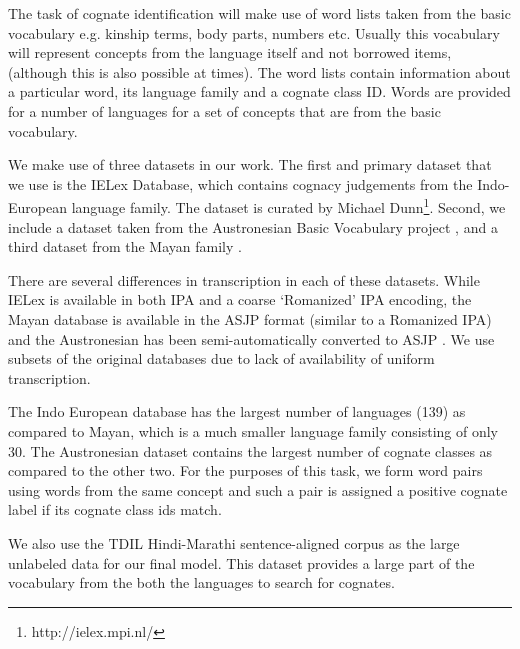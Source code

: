 \documentclass[11pt,letterpaper]{article}
\begin{document}
The task of cognate identification will make use of word lists taken from the basic vocabulary e.g. kinship terms, body parts, numbers etc. Usually this vocabulary will represent concepts from the language itself and not borrowed items, (although this is also possible at times). The word lists contain information about a particular word, its language family and a cognate class ID. Words are provided for a number of languages for a set of concepts that are from the basic vocabulary.

We make use of three datasets in our work. The first and primary dataset that we use is the IELex Database, which contains cognacy judgements from the Indo-European language family. The dataset is curated by Michael Dunn\footnote{http://ielex.mpi.nl/}. Second, we include a dataset taken from the Austronesian Basic Vocabulary project \cite{greenhillBlust:08}, and a third dataset from the Mayan family \cite{wichmann:2008}. 

There are several differences in transcription in each of these datasets. While IELex is available in both IPA and a coarse `Romanized' IPA encoding, the Mayan database is available in the ASJP format (similar to a Romanized IPA) \cite{Brown:08} and the Austronesian has been semi-automatically converted to ASJP \cite{rama2016siamese}. We use subsets of the original databases due to lack of availability of uniform transcription.

The Indo European database has the largest number of languages (139) as compared to Mayan, which is a much smaller language family consisting of only 30. The Austronesian dataset contains the largest number of cognate classes as compared to the other two. For the purposes of this task, we form word pairs using words from the same concept and such a pair is assigned a positive cognate label if its cognate class ids match. 

We also use the TDIL Hindi-Marathi sentence-aligned corpus as the large unlabeled data for our final model. This dataset provides a large part of the vocabulary from the both the languages to search for cognates.

\end{document}
